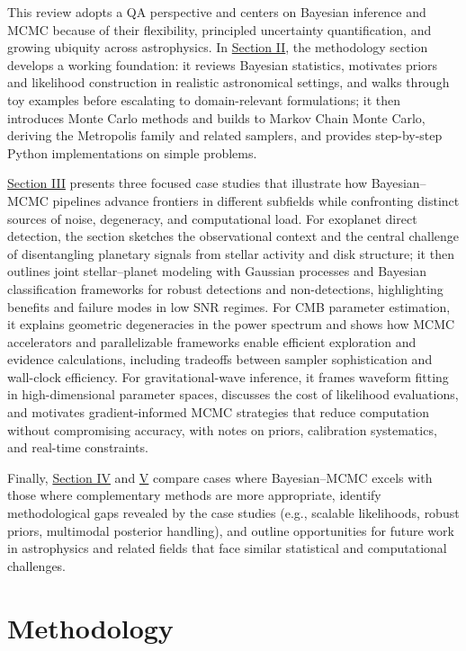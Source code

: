 \documentclass[preprint,longauthor]{aastex631}
\numberwithin{equation}{section}
\begin{document}
This review adopts a QA perspective and centers on Bayesian inference and MCMC because of their flexibility, principled uncertainty quantification, and growing ubiquity across astrophysics. In \hyperref[sec:Methodology]{Section II}, the methodology section develops a working foundation: it reviews Bayesian statistics, motivates priors and likelihood construction in realistic astronomical settings, and walks through toy examples before escalating to domain-relevant formulations; it then introduces Monte Carlo methods and builds to Markov Chain Monte Carlo, deriving the Metropolis family and related samplers, and provides step-by-step Python implementations on simple problems.

\hyperref[sec:CaseStudies]{Section III} presents three focused case studies that illustrate how Bayesian–MCMC pipelines advance frontiers in different subfields while confronting distinct sources of noise, degeneracy, and computational load. For exoplanet direct detection, the section sketches the observational context and the central challenge of disentangling planetary signals from stellar activity and disk structure; it then outlines joint stellar–planet modeling with Gaussian processes and Bayesian classification frameworks for robust detections and non-detections, highlighting benefits and failure modes in low SNR regimes. For CMB parameter estimation, it explains geometric degeneracies in the power spectrum and shows how MCMC accelerators and parallelizable frameworks enable efficient exploration and evidence calculations, including tradeoffs between sampler sophistication and wall-clock efficiency. For gravitational-wave inference, it frames waveform fitting in high-dimensional parameter spaces, discusses the cost of likelihood evaluations, and motivates gradient-informed MCMC strategies that reduce computation without compromising accuracy, with notes on priors, calibration systematics, and real-time constraints.

Finally, \hyperref[placeholder]{Section IV} and \hyperref[placeholder]{V} compare cases where Bayesian–MCMC excels with those where complementary methods are more appropriate, identify methodological gaps revealed by the case studies (e.g., scalable likelihoods, robust priors, multimodal posterior handling), and outline opportunities for future work in astrophysics and related fields that face similar statistical and computational challenges.

\section{Methodology}
\label{sec:Methodology}
\end{document}
